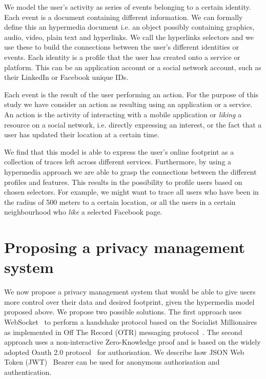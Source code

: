 We model the user's activity as series of events belonging to a certain identity. Each event is a document containing different information. We can formally define this an hypermedia document i.e. an object possibly containing graphics, audio, video, plain text and hyperlinks. We call the hyperlinks selectors and we use these to build the connections between the user's different identities or events. Each identity is a profile that the user has created onto a service or platform. This can be an application account or a social network account, such as their LinkedIn or Facebook unique IDs.

Each event is the result of the user performing an action. For the purpose of this study we have consider an action as resulting using an application or a service. An action is the activity of interacting with a mobile application or \emph{liking} a resource on a social network, i.e. directly expressing an interest, or the fact that a user has updated their location at a certain time.

We find that this model is able to express the user's online footprint as a collection of traces left across different services. Furthermore, by using a hypermedia approach we are able to grasp the connections between the different profiles and features. This results in the possibility to profile users based on chosen selectors. For example, we might want to trace all users who have been in the radius of 500 meters to a certain location, or all the users in a certain neighbourhood who \emph{like} a selected Facebook page.

\section{Proposing a privacy management system}

We now propose a privacy management system that would be able to give users more control over their data and desired footprint, given the hypermedia model proposed above. We propose two possible solutions. The first approach uses WebSocket~\cite{fetterfc} to perform a handshake protocol based on the Socialist Millionaires as implemented in Off The Record (OTR) messaging protocol~\cite{goldberg2012off}. The second approach uses a non-interactive Zero-Knowledge proof and is based on the widely adopted Oauth 2.0 protocol~\cite{hardt2012oauth} for authorisation. We describe how JSON Web Token (JWT)~\cite{jones2015json} Bearer can be used for anonymous authorisation and authentication.


